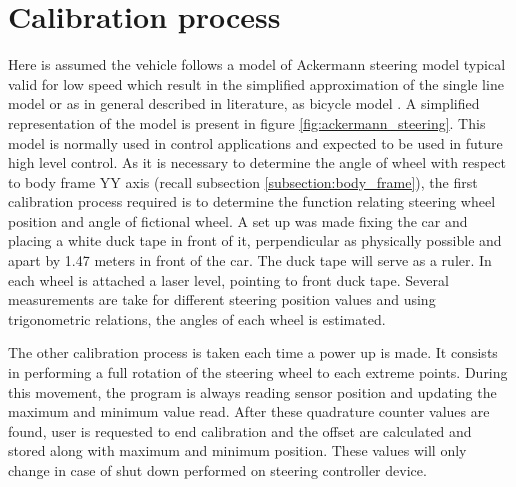 \section{Calibration process}
Here is assumed the vehicle follows a model of Ackermann steering model typical valid for low speed which result in the simplified approximation of the single line model or as in general described in literature, as bicycle model\cite{Snider2009} \cite{Navigation_System_Design}. A simplified representation of the model is present in figure \ref{fig:ackermann_steering}. This model is normally used in control applications and expected to be used in future high level control. As it is necessary to determine the angle of wheel with respect to body frame YY axis (recall subsection \ref{subsection:body_frame}), the first calibration process required is to determine the function relating steering wheel position and angle of fictional wheel. A set up was made fixing the car and placing a white duck tape in front of it, perpendicular as physically possible and apart by 1.47 meters in front of the car. The duck tape will serve as a ruler. In each wheel is attached a laser level, pointing to front duck tape. Several measurements are take for different steering position values and using trigonometric relations, the angles of each wheel is estimated. 

The other calibration process is taken each time a power up is made. It consists in performing a full rotation of the steering wheel to each extreme points. During this movement, the program is always reading sensor position and updating the maximum and minimum value read. After these quadrature counter values are found, user is requested to end calibration and the offset are calculated and stored along with maximum and minimum position. These values will only change in case of shut down performed on steering controller device.

